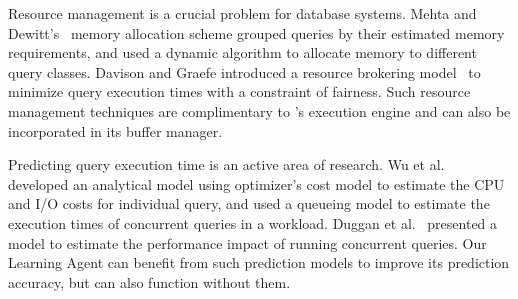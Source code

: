 Resource management is a crucial problem for database systems. 
Mehta and Dewitt's~\cite{mehta1993dynamic} memory allocation scheme
grouped queries by their estimated memory requirements, and used a dynamic 
algorithm to allocate memory to different query classes. 
Davison and Graefe introduced a resource brokering model~\cite{davison1995dynamic} to minimize query execution times with a constraint of fairness. 
Such resource management techniques are complimentary to \sys{}'s execution engine 
and can also be incorporated in its buffer manager. 

Predicting query execution time is an active area of research. 
Wu et al.~\cite{wu2013towards, wu2014uncertainty} developed an analytical model using optimizer's cost model to estimate the CPU and I/O costs for individual query, and used a queueing model to estimate the execution times of concurrent queries in a workload. 
Duggan et al.~\cite{duggan2011performance} presented a model to estimate the performance impact of running concurrent queries.
Our Learning Agent can benefit from such prediction models to improve its prediction accuracy, but can also function without them. 

